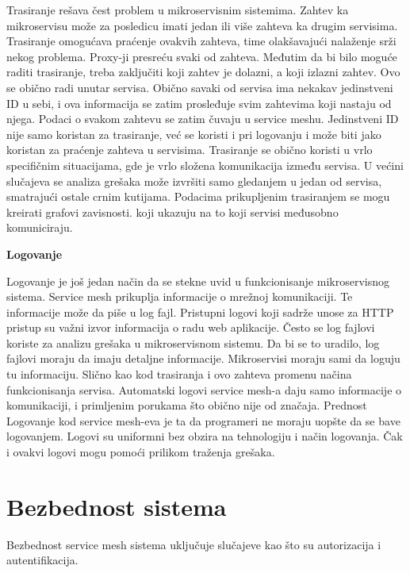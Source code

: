 \documentclass[a4paper,12pt]{report}
\begin{document}
Trasiranje rešava čest problem u mikroservisnim sistemima. Zahtev ka mikroservisu može za posledicu imati jedan ili više zahteva ka drugim servisima. Trasiranje omogućava praćenje ovakvih zahteva, time olakšavajući nalaženje srži nekog problema. Proxy-ji presreću svaki od zahteva. Međutim da bi bilo moguće raditi trasiranje, treba zaključiti koji zahtev je dolazni, a koji izlazni zahtev. Ovo se obično radi unutar servisa. Obično savaki od servisa ima nekakav jedinstveni ID u sebi, i ova informacija se zatim prosleđuje svim zahtevima koji nastaju od njega. Podaci o svakom zahtevu se  zatim čuvaju u service meshu. Jedinstveni ID nije samo koristan za trasiranje, već se koristi i pri logovanju i može biti jako koristan za praćenje zahteva u servisima. Trasiranje se obično koristi u vrlo specifičnim situacijama, gde je vrlo složena komunikacija između servisa. U većini slučajeva se analiza grešaka može izvršiti samo gledanjem u jedan od servisa, smatrajući ostale crnim kutijama. Podacima prikupljenim trasiranjem se mogu kreirati grafovi zavisnosti. koji ukazuju na to koji servisi međusobno komuniciraju. \newline

\textbf{Logovanje}\newline

Logovanje je još jedan način da se stekne uvid u funkcionisanje mikroservisnog sistema. Service mesh prikuplja informacije o mrežnoj komunikaciji. Te informacije može da piše u log fajl. Pristupni logovi koji sadrže unose za HTTP pristup su važni izvor informacija o radu web aplikacije. Često se log fajlovi koriste za analizu grešaka u mikroservisnom sistemu. Da bi se to uradilo, log fajlovi moraju da imaju detaljne informacije. Mikroservisi moraju sami da loguju tu informaciju. Slično kao kod trasiranja i ovo zahteva promenu načina funkcionisanja servisa. Automatski logovi service mesh-a daju samo informacije o komunikaciji, i primljenim porukama što obično nije od značaja. Prednost Logovanje kod service mesh-eva je ta da programeri ne moraju uopšte da se bave logovanjem. Logovi su uniformni bez obzira na tehnologiju i način logovanja. Čak i ovakvi logovi mogu pomoći prilikom traženja grešaka. \newline
 
\section{Bezbednost sistema}

Bezbednost service mesh sistema uključuje slučajeve kao što su autorizacija i autentifikacija. \newline
\end{document}
